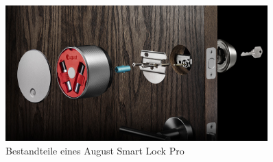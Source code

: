     	\begin{figure}[H]
    		\centering
    		\includegraphics[width=0.9\textwidth]{graphics/august_2.jpg}
    		\caption{Bestandteile eines August Smart Lock Pro\cite{August}}
    		\label{fig:august1}
    	\end{figure}
    

